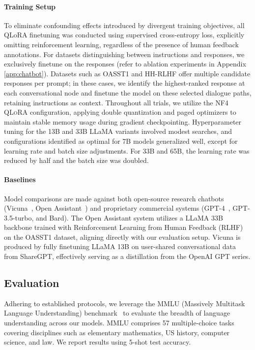 \paragraph{Training Setup} To eliminate confounding effects introduced by divergent training objectives, all QLoRA finetuning was conducted using supervised cross-entropy loss, explicitly omitting reinforcement learning, regardless of the presence of human feedback annotations. For datasets distinguishing between instructions and responses, we exclusively finetune on the responses (refer to ablation experiments in Appendix \ref{app:chatbot}). Datasets such as OASST1 and HH-RLHF offer multiple candidate responses per prompt; in these cases, we identify the highest-ranked response at each conversational node and finetune the model on these selected dialogue paths, retaining instructions as context. Throughout all trials, we utilize the NF4 \textsc{QLoRA} configuration, applying double quantization and paged optimizers to maintain stable memory usage during gradient checkpointing. Hyperparameter tuning for the 13B and 33B LLaMA variants involved modest searches, and configurations identified as optimal for 7B models generalized well, except for learning rate and batch size adjustments. For 33B and 65B, the learning rate was reduced by half and the batch size was doubled.

\paragraph{Baselines} Model comparisons are made against both open-source research chatbots (Vicuna~\citep{vicuna2023}, Open Assistant~\citep{kopf2023openassistant}) and proprietary commercial systems (GPT-4~\citep{openai2023gpt}, GPT-3.5-turbo, and Bard). The Open Assistant system utilizes a LLaMA 33B backbone trained with Reinforcement Learning from Human Feedback (RLHF) on the OASST1 dataset, aligning directly with our evaluation setup. Vicuna is produced by fully finetuning LLaMA 13B on user-shared conversational data from ShareGPT, effectively serving as a distillation from the OpenAI GPT series.

\subsection{Evaluation}

Adhering to established protocols, we leverage the MMLU (Massively Multitask Language Understanding) benchmark~\citep{hendrycksmeasuring} to evaluate the breadth of language understanding across our models. MMLU comprises 57 multiple-choice tasks covering disciplines such as elementary mathematics, US history, computer science, and law. We report results using 5-shot test accuracy.

